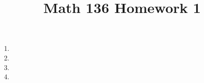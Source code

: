 \documentclass{article}
\title{Math 136 Homework 1}
\begin{document}
\maketitle
\begin{enumerate}
	\item 
	\item 
	\item 
	\item 
\end{enumerate}
\end{document}

